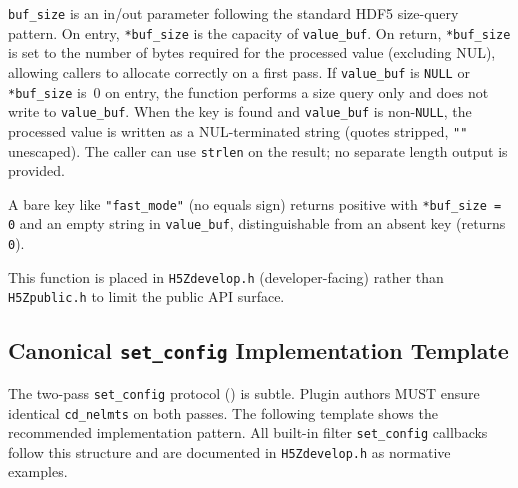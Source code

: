 \documentclass[../HDF5_RFC.tex]{subfiles}
\begin{document}
\texttt{buf\_size} is an in/out parameter following the standard HDF5 size-query
pattern. On entry, \texttt{*buf\_size} is the capacity of \texttt{value\_buf}. On
return, \texttt{*buf\_size} is set to the number of bytes required for the processed
value (excluding NUL), allowing callers to allocate correctly on a first pass.
If \texttt{value\_buf} is \texttt{NULL} or \texttt{*buf\_size} is~0 on entry, the function
performs a size query only and does not write to \texttt{value\_buf}.  When the key
is found and \texttt{value\_buf} is non-\texttt{NULL}, the processed value is written as a
NUL-terminated string (quotes stripped, \texttt{""} unescaped).  The caller can use
\texttt{strlen} on the result; no separate length output is provided.

A bare key like \texttt{"fast\_mode"} (no equals sign) returns positive with
\texttt{*buf\_size = 0} and an empty string in \texttt{value\_buf}, distinguishable
from an absent key (returns \texttt{0}).

This function is placed in \texttt{H5Zdevelop.h} (developer-facing) rather than
\texttt{H5Zpublic.h} to limit the public API surface.


\subsection{Canonical \texttt{set\_config} Implementation Template}
\label{sec:set-config-template}

The two-pass \texttt{set\_config} protocol () is
subtle. Plugin authors MUST ensure identical \texttt{cd\_nelmts} on both passes.
The following template shows the recommended implementation pattern. All
built-in filter \texttt{set\_config} callbacks follow this structure and are
documented in \texttt{H5Zdevelop.h} as normative examples.
\end{document}
